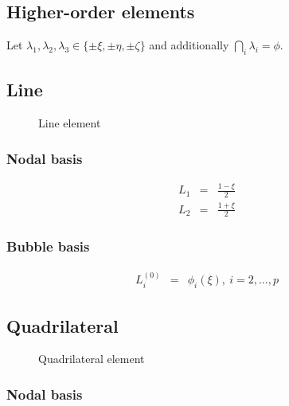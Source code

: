 \subsection{Higher-order elements}

\label{app:pbasis}

Let $\lambda_1,\lambda_2,\lambda_3 \in \{\pm\xi,\pm\eta,\pm\zeta \}$
and additionally $\bigcap_i\lambda_i=\phi$. 

\subsection{Line}

\begin{figure}[tbhp]
\begin{center}

\caption{Line element}
\end{center}
\end{figure}

\subsubsection{Nodal basis}

\begin{eqnarray*}
L_1&=&\frac{1-\xi}{2} \\
L_2&=&\frac{1+\xi}{2}
\end{eqnarray*}

\subsubsection{Bubble basis}

\begin{eqnarray*}
L_i^{(0)}&=&\phi_i(\xi),\ i=2,\ldots,p
\end{eqnarray*}

\subsection{Quadrilateral}

\begin{figure}[tbhp]
\begin{center}

\caption{Quadrilateral element}
\end{center}
\end{figure}

\subsubsection{Nodal basis}

